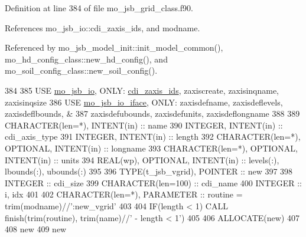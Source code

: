 Definition at line 384 of file mo\+\_\+jsb\+\_\+grid\+\_\+class.\+f90.



References mo\+\_\+jsb\+\_\+io\+::cdi\+\_\+zaxis\+\_\+ids, and modname.



Referenced by mo\+\_\+jsb\+\_\+model\+\_\+init\+::init\+\_\+model\+\_\+common(), mo\+\_\+hd\+\_\+config\+\_\+class\+::new\+\_\+hd\+\_\+config(), and mo\+\_\+soil\+\_\+config\+\_\+class\+::new\+\_\+soil\+\_\+config().


\begin{DoxyCode}
384 
385     \textcolor{keywordtype}{USE }\hyperlink{namespacemo__jsb__io}{mo\_jsb\_io}\textcolor{keywordtype}{,       ONLY}: \hyperlink{namespacemo__jsb__io_a40fcb52ae787aaf48e1497bf80759dfb}{cdi\_zaxis\_ids}, zaxiscreate, zaxisinqname, zaxisinqsize
386     \textcolor{keywordtype}{USE }\hyperlink{namespacemo__jsb__io__iface}{mo\_jsb\_io\_iface}\textcolor{keywordtype}{, ONLY}: zaxisdefname, zaxisdeflevels, zaxisdeflbounds,          &
387                                zaxisdefubounds, zaxisdefunits, zaxisdeflongname
388 
389     \textcolor{keywordtype}{CHARACTER(len=*)},           \textcolor{keywordtype}{INTENT(in)} :: name
390     \textcolor{keywordtype}{INTEGER},                    \textcolor{keywordtype}{INTENT(in)} :: cdi\_axis\_type
391     \textcolor{keywordtype}{INTEGER},                    \textcolor{keywordtype}{INTENT(in)} :: length
392     \textcolor{keywordtype}{CHARACTER(len=*)}, \textcolor{keywordtype}{OPTIONAL}, \textcolor{keywordtype}{INTENT(in)} :: longname
393     \textcolor{keywordtype}{CHARACTER(len=*)}, \textcolor{keywordtype}{OPTIONAL}, \textcolor{keywordtype}{INTENT(in)} :: units
394     \textcolor{keywordtype}{REAL(wp)},         \textcolor{keywordtype}{OPTIONAL}, \textcolor{keywordtype}{INTENT(in)} :: levels(:), lbounds(:), ubounds(:)
395 
396     \textcolor{keywordtype}{TYPE}(t\_jsb\_vgrid), \textcolor{keywordtype}{POINTER} :: new
397 
398     \textcolor{keywordtype}{INTEGER} :: cdi\_size
399     \textcolor{keywordtype}{CHARACTER(len=100)} :: cdi\_name
400     \textcolor{keywordtype}{INTEGER} :: i, idx
401 
402     \textcolor{keywordtype}{CHARACTER(len=*)}, \textcolor{keywordtype}{PARAMETER} :: routine = trim(modname)//\textcolor{stringliteral}{':new\_vgrid'}
403 
404     \textcolor{keywordflow}{IF}(length < 1) \textcolor{keyword}{CALL }finish(trim(routine), trim(name)//\textcolor{stringliteral}{' - length < 1'})
405 
406     \textcolor{keyword}{ALLOCATE}(new)
407 
408     new%
409     new%

\end{DoxyCode}
